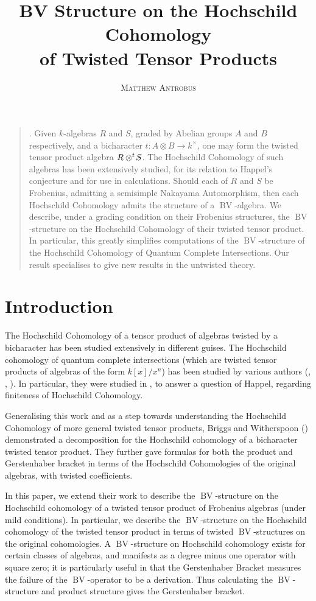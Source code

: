 \documentclass{article}
\title{\Large BV Structure on the Hochschild Cohomology\\ of Twisted Tensor Products}
\author{\textsc{Matthew Antrobus}}
\date{}
\newcommand{\twisten}{\otimes^t\hspace{-1pt}}
\newcommand{\bv}{\operatorname{BV}}
\theoremstyle{plain}
\theoremstyle{definition}
\renewenvironment{abstract}
{\begin{quote}
\noindent\par{\scshape\abstractname.}}
{\medskip\noindent
\end{quote}
}
\begin{document}
\maketitle
\begin{abstract} 
Given  $k$-algebras $R$ and $S$, graded by Abelian groups $A$ and $B$ respectively, and a bicharacter $t:A \otimes B \rightarrow k^\times$, one may form the twisted tensor product algebra $R\twisten S$. The Hochschild Cohomology of such algebras has been extensively studied, for its relation to Happel's conjecture and for use in calculations. Should each of $R$ and $S$ be Frobenius, admitting a semisimple Nakayama Automorphism, then each Hochschild Cohomology admits the structure of a $\bv$-algebra. We describe, under a grading condition on their Frobenius structures, the $\bv$-structure on the Hochschild Cohomology of their twisted tensor product. In particular, this greatly simplifies computations of the $\bv$-structure of the Hochschild Cohomology of Quantum Complete Intersections. Our result specialises to give new results in the untwisted theory.
\end{abstract}
\vspace{-10pt}
\tableofcontents
\newpage
\section{Introduction}
The Hochschild Cohomology of a tensor product of algebras twisted by a bicharacter has been studied extensively in different guises. The Hochschild cohomology of quantum complete intersections (which are twisted tensor products of algebras of the form $k[x]/x^n$) has been studied by various authors (\cite{erdmann}, \cite{bergh}, \cite{oppermann}). In particular, they were studied in \cite{buchweitz}, to answer a question of Happel, regarding finiteness of Hochschild Cohomology.

Generalising this work and as a step towards understanding the Hochschild Cohomology of more general twisted tensor products, Briggs and Witherspoon (\cite{BriggsWitherspoon}) demonstrated a decomposition for the Hochschild cohomology of a bicharacter twisted tensor product. They further gave formulas for both the product and Gerstenhaber bracket in terms of the Hochschild Cohomologies of the original algebras, with twisted coefficients. 

In this paper, we extend their work to describe the $\bv$-structure on the Hochschild cohomology of a twisted tensor product of Frobenius algebras (under mild conditions). In particular, we describe the $\bv$-structure on the Hochschild cohomology of the twisted tensor product in terms of twisted $\bv$-structures on the original cohomologies. A $\bv$-structure on Hochschild cohomology exists for certain classes of algebras, and manifests as a degree minus one operator with square zero; it is particularly useful in that the Gerstenhaber Bracket measures the failure of the $\bv$-operator to be a derivation. Thus calculating the $\bv$-structure and product structure gives the Gerstenhaber bracket. 
\end{document}
